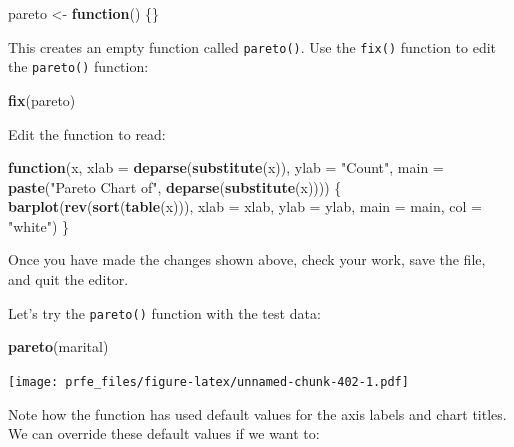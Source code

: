 \documentclass[12pt,a4paper]{book}
\newenvironment{Shaded}{\begin{snugshade}}{\end{snugshade}}
\newcommand{\ControlFlowTok}[1]{\textcolor[rgb]{0.13,0.29,0.53}{\textbf{#1}}}
\newcommand{\DataTypeTok}[1]{\textcolor[rgb]{0.13,0.29,0.53}{#1}}
\newcommand{\KeywordTok}[1]{\textcolor[rgb]{0.13,0.29,0.53}{\textbf{#1}}}
\newcommand{\NormalTok}[1]{#1}
\newcommand{\StringTok}[1]{\textcolor[rgb]{0.31,0.60,0.02}{#1}}
\theoremstyle{definition}
\theoremstyle{definition}
\theoremstyle{definition}
\theoremstyle{remark}
\begin{document}
\begin{Shaded}
\begin{Highlighting}[]
\NormalTok{pareto <-}\StringTok{ }\ControlFlowTok{function}\NormalTok{() \{\}}
\end{Highlighting}
\end{Shaded}

This creates an empty function called \texttt{pareto()}. Use the
\texttt{fix()} function to edit the \texttt{pareto()} function:

\begin{Shaded}
\begin{Highlighting}[]
\KeywordTok{fix}\NormalTok{(pareto)}
\end{Highlighting}
\end{Shaded}

Edit the function to read:

\begin{Shaded}
\begin{Highlighting}[]
\ControlFlowTok{function}\NormalTok{(x,}
         \DataTypeTok{xlab =} \KeywordTok{deparse}\NormalTok{(}\KeywordTok{substitute}\NormalTok{(x)),}
         \DataTypeTok{ylab =} \StringTok{"Count"}\NormalTok{,}
         \DataTypeTok{main =} \KeywordTok{paste}\NormalTok{(}\StringTok{"Pareto Chart of"}\NormalTok{, }\KeywordTok{deparse}\NormalTok{(}\KeywordTok{substitute}\NormalTok{(x)))) \{}
  \KeywordTok{barplot}\NormalTok{(}\KeywordTok{rev}\NormalTok{(}\KeywordTok{sort}\NormalTok{(}\KeywordTok{table}\NormalTok{(x))),}
          \DataTypeTok{xlab =}\NormalTok{ xlab,}
          \DataTypeTok{ylab =}\NormalTok{ ylab,}
          \DataTypeTok{main =}\NormalTok{ main,}
          \DataTypeTok{col =} \StringTok{"white"}\NormalTok{)}
\NormalTok{\}}
\end{Highlighting}
\end{Shaded}

Once you have made the changes shown above, check your work, save the
file, and quit the editor.

Let's try the \texttt{pareto()} function with the test data:

\begin{Shaded}
\begin{Highlighting}[]
\KeywordTok{pareto}\NormalTok{(marital)}
\end{Highlighting}
\end{Shaded}

\texttt{[image: prfe\_files/figure-latex/unnamed-chunk-402-1.pdf]}

Note how the function has used default values for the axis labels and
chart titles. We can override these default values if we want to:
\end{document}
